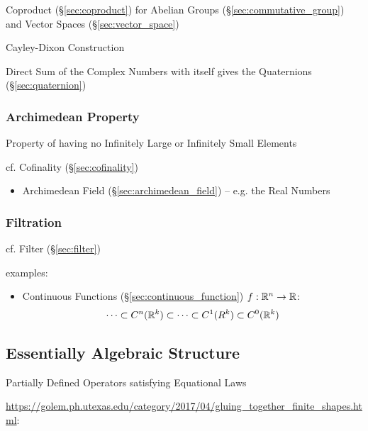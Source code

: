 Coproduct (\S\ref{sec:coproduct}) for Abelian Groups
(\S\ref{sec:commutative_group}) and Vector Spaces
(\S\ref{sec:vector_space})

Cayley-Dixon Construction

Direct Sum of the Complex Numbers with itself gives the Quaternions
(\S\ref{sec:quaternion})



\subsubsection{Archimedean Property}\label{sec:archimedean_property}

Property of having no Infinitely Large or Infinitely Small Elements

cf. Cofinality (\S\ref{sec:cofinality})

\begin{itemize}
  \item Archimedean Field (\S\ref{sec:archimedean_field}) -- e.g. the Real
    Numbers
\end{itemize}



\subsubsection{Filtration}\label{sec:filtration}

cf. Filter (\S\ref{sec:filter})

examples:
\begin{itemize}
  \item Continuous Functions (\S\ref{sec:continuous_function})
    $f : \mathbb{R}^n \rightarrow \mathbb{R}$:
    \[
      \cdots \subset C^n(\mathbb{R}^k) \subset \cdots \subset C^1(R^k) \subset
        C^0(\mathbb{R}^k)
    \]
\end{itemize}



\subsection{Essentially Algebraic Structure}
\label{sec:essentially_algebraic}

Partially Defined Operators satisfying Equational Laws

\url{https://golem.ph.utexas.edu/category/2017/04/gluing_together_finite_shapes.html}:

